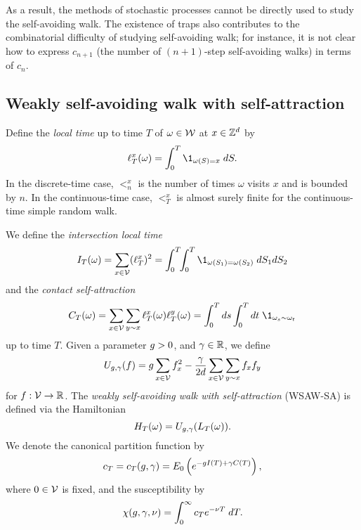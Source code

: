 As a result, the methods of stochastic processes cannot be directly used to study the self-avoiding
walk. The existence of traps also contributes to the combinatorial difficulty of studying
self-avoiding walk; for instance, it is not clear how to express $c_{n+1}$ (the number of
$(n+1)$-step self-avoiding walks) in terms of $c_n$.



\subsection{Weakly self-avoiding walk with self-attraction}

Define the \emph{local time} up to time $T$ of $\omega \in \mathcal{W}$ at $x \in { {{\mathbb Z}}^d }$ by
\begin{equation}
\lt^x_T(\omega) = \int_0^T \1_{\omega(S)=x} \; dS.
\end{equation}
In the discrete-time case, $\lt^x_n$ is the number of times $\omega$ visits $x$
and is bounded by $n$. In the continuous-time case, $\lt^x_T$ is almost surely
finite for the continuous-time simple random walk.

We define the \emph{intersection local time}
\begin{equation}
\label{e:ITdef}
I_T(\omega) = \sum_{x\in\vertices} (\lt^x_T)^2
  =
\int_0^T \!\! \int_0^T \1_{\omega(S_1)=\omega(S_2)} \; dS_1 dS_2
\end{equation}
and the \emph{contact self-attraction}
\begin{equation}
\label{e:CTdef}
C_T(\omega) =
  \sum_{x \in \vertices} \sum_{y \sim x} \lt_T^x(\omega) \lt_T^y(\omega)
  = \int_0^T ds \int_0^T dt \; \1_{\omega_{s} \sim \omega_{t}}
\end{equation}
up to time $T$.
Given a parameter $g > 0$,
and $\gamma \in {\mathbb R}$, we define
\begin{equation}
\label{e:Udef-neg}
U_{g,\gamma}(f)
=
g \sum_{x\in\mathcal{V}} f_x^2
- \frac{\gamma}{2d}
\sum_{x\in\mathcal{V}} \sum_{y \sim x} f_x f_y
\end{equation}
for $f : \mathcal{V} \rightarrow {\mathbb R}$.
The \emph{weakly self-avoiding walk with self-attraction} (WSAW-SA) is defined via
the Hamiltonian
\begin{equation}
H_T(\omega) = U_{g,\gamma}(L_T(\omega)).
\end{equation}
We denote the canonical partition function by
\begin{equation}
c_T = c_T(g, \gamma) = E_0 \left( e^{-g I(T) + \gamma C(T)} \right),
\end{equation}
where $0 \in \mathcal{V}$ is fixed, and the susceptibility by
\begin{equation}
\chi(g, \gamma, \nu) = \int_0^\infty c_T e^{-\nu T} \; dT.
\end{equation}

